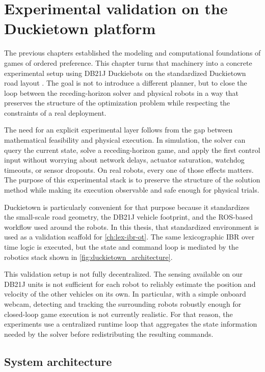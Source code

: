 \chapter{Experimental validation on the Duckietown platform}
\label{ch:duckietown}

The previous chapters established the modeling and computational foundations of games of ordered preference.
This chapter turns that machinery into a concrete experimental setup using DB21J Duckiebots on the
standardized Duckietown road layout \cite{duckietown:2017}.
The goal is not to introduce a different planner, but to close the loop between the receding-horizon solver
and physical robots in a way that preserves the structure of the optimization problem while respecting the
constraints of a real deployment.

The need for an explicit experimental layer follows from the gap between mathematical feasibility and
physical execution.
In simulation, the solver can query the current state, solve a receding-horizon game, and apply the first
control input without worrying about network delays, actuator saturation, watchdog timeouts, or sensor
dropouts.
On real robots, every one of those effects matters.
The purpose of this experimental stack is to preserve the structure of the solution method while
making its execution observable and safe enough for physical trials.

Duckietown is particularly convenient for that purpose because it standardizes the small-scale road geometry,
the DB21J vehicle footprint, and the ROS-based workflow used around the robots.
In this thesis, that standardized environment is used as a validation scaffold for \cref{ch:lex-ibr-ot}. The same
lexicographic IBR over time logic is executed, but the state and command loop is mediated by the
robotics stack shown in \cref{fig:duckietown_architecture}.

This validation setup is not fully decentralized.
The sensing available on our DB21J units is not sufficient for each robot to reliably estimate the position
and velocity of the other vehicles on its own.
In particular, with a simple onboard webcam, detecting and tracking the surrounding robots robustly enough
for closed-loop game execution is not currently realistic.
For that reason, the experiments use a centralized runtime loop that aggregates the state information needed
by the solver before redistributing the resulting commands.

\section{System architecture}
\label{sec:duckietown-architecture}

